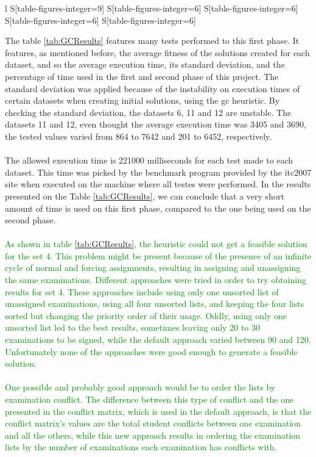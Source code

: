 \begin{table}[t]
\begin{tabular}{%
	 l%
     S[table-figures-integer=9]%
     S[table-figures-integer=6]%
     S[table-figures-integer=6]%
     S[table-figures-integer=6]%
     S[table-figures-integer=6]%
    }
\bottomrule

\end{tabular}
\label{tab:GCResults}

\end{table}The table \ref{tab:GCResults} features many tests performed to this first phase. It features, as mentioned before, the average fitness of the solutions created for each dataset, and so the average execution time, its standard deviation, and the percentage of time used in the first and second phase of this project. The standard deviation was applied because of the instability on execution times of certain datasets when creating initial solutions, using the \gls{gc} heuristic. By checking the standard deviation, the datasets 6, 11 and 12 are unstable. The datasets 11 and 12, even thought the average execution time was 3405 and 3690, the tested values varied from 864 to 7642 and 201 to 6452, respectively.\\
\\
The allowed execution time is 221000 milliseconds for each test made to each dataset. This time was picked by the benchmark program provided by the \gls{itc2007} site \cite{McCollum2007e} when executed on the machine where all testes were performed. In the results presented on the Table \ref{tab:GCResults}, we can conclude that a very short amount of time is used on this first phase, compared to the one being used on the second phase.\\
\\
\textcolor{green}{As shown in table \ref{tab:GCResults}, the heuristic could not get a feasible solution for the set 4. This problem might be present because of the presence of an infinite cycle of normal and forcing assignments, resulting in assigning and unassigning the same examinations. Different approaches were tried in order to try obtaining results for set 4. These approaches include using only one unsorted list of unassigned examinations, using all four unsorted lists, and keeping the four lists sorted but changing the priority order of their usage. Oddly, using only one unsorted list led to the best results, sometimes leaving only 20 to 30 examinations to be signed, while the default approach varied between 90 and 120. Unfortunately none of the approaches were good enough to generate a feasible solution.\\
\\
One possible and probably good approach would be to order the lists by examination conflict. The difference between this type of conflict and the one presented in the conflict matrix, which is used in the default approach, is that the conflict matrix's values are the total student conflicts between one examination and all the others, while this new approach results in ordering the examination lists by the number of examinations each examination has conflicts with.}
